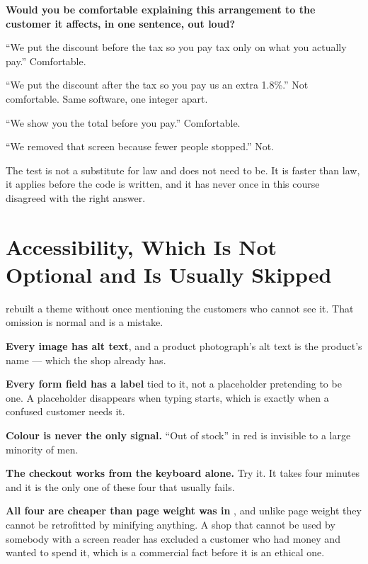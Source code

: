 \begin{conceptbox}
\textbf{Would you be comfortable explaining this arrangement to the customer it
affects, in one sentence, out loud?}

\begin{tight}
  \item ``We put the discount before the tax so you pay tax only on what you
        actually pay.'' Comfortable.
  \item ``We put the discount after the tax so you pay us an extra 1.8\%.''
        Not comfortable. Same software, one integer apart.
  \item ``We show you the total before you pay.'' Comfortable.
  \item ``We removed that screen because fewer people stopped.'' Not.
\end{tight}

\smallskip
The test is not a substitute for law and does not need to be. It is faster than
law, it applies before the code is written, and it has never once in this
course disagreed with the right answer.
\end{conceptbox}

\section{Accessibility, Which Is Not Optional and Is Usually Skipped}

\begin{conceptbox}
 rebuilt a theme without once mentioning the customers who cannot see
it. That omission is normal and is a mistake.

\begin{tightnum}
  \item \textbf{Every image has alt text}, and a product photograph's alt text
        is the product's name --- which the shop already has.
  \item \textbf{Every form field has a label} tied to it, not a placeholder
        pretending to be one. A placeholder disappears when typing starts,
        which is exactly when a confused customer needs it.
  \item \textbf{Colour is never the only signal.} ``Out of stock'' in red is
        invisible to a large minority of men.
  \item \textbf{The checkout works from the keyboard alone.} Try it. It takes
        four minutes and it is the only one of these four that usually fails.
\end{tightnum}

\smallskip
\textbf{All four are cheaper than page weight was in }, and unlike
page weight they cannot be retrofitted by minifying anything. A shop that
cannot be used by somebody with a screen reader has excluded a customer who had
money and wanted to spend it, which is a commercial fact before it is an
ethical one.
\end{conceptbox}

